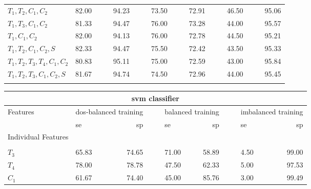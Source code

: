 \begin{table}
{\begin{center}
\begin{tabularx}{0.95\textwidth}{@{}l	lllr	 ll	lllr	 ll lllr @{}}
$T_1,T_2,C_1,C_2$			& \cellcolor[gray]{0.8}82.00	&\cellcolor[gray]{0.8} &\cellcolor[gray]{0.8} & \cellcolor[gray]{0.8}94.23	& & & 73.50 & & & 72.91 & & & 46.50 & & & 95.06\\
$T_1,T_3,C_1,C_2$			& \cellcolor[gray]{0.8}81.33	&\cellcolor[gray]{0.8} &\cellcolor[gray]{0.8} & \cellcolor[gray]{0.8}94.47	& & & 76.00 & & & 73.28 & & & 44.00 & & & 95.57\\
$T_1,C_1,C_2$				& \cellcolor[gray]{0.8}82.00	&\cellcolor[gray]{0.8} &\cellcolor[gray]{0.8} & \cellcolor[gray]{0.8}94.13	& & & 76.00	& & & 72.78 & & & 44.50 & & & 95.21\\
$T_1,T_2,C_1,C_2,S$			& \cellcolor[gray]{0.8}82.33	&\cellcolor[gray]{0.8} &\cellcolor[gray]{0.8} & \cellcolor[gray]{0.8}94.47	& & & 75.50	 & & & 72.42& & & 43.50 & & & 95.33\\
$T_1,T_2,T_3,T_4,C_1,C_2$	& \cellcolor[gray]{0.8}80.83	&\cellcolor[gray]{0.8} &\cellcolor[gray]{0.8} & \cellcolor[gray]{0.8}95.11	& & & 75.00	& & & 72.59 & & & 43.00 & & & 95.84\\
$T_1,T_2,T_3,C_1,C_2,S$		& \cellcolor[gray]{0.8}81.67	&\cellcolor[gray]{0.8} &\cellcolor[gray]{0.8} & \cellcolor[gray]{0.8}94.74	& & & 74.50 & & & 72.96 & & & 44.00 & & & 95.45\\
 	\multicolumn{17}{l}{}\\
  \end{tabularx}  
  \bigskip
	\begin{tabularx}{0.95\textwidth}{@{}l	lllr	 ll	lllr	 ll lllr @{}}
	\toprule
	\multicolumn{17}{c}{ \ac{svm} classifier}\\
	\midrule
	Features & \multicolumn{4}{l}{\ac{dos}-balanced training} & & & \multicolumn{4}{l}{balanced training} & & & \multicolumn{4}{l}{imbalanced training} \\
	\cmidrule{2-5} \cmidrule{8-11} \cmidrule{14-17}
	& \ac{se} & & & \ac{sp} & & &  \ac{se} & & & \ac{sp} & & & \ac{se} & & & \ac{sp} \\
	\cmidrule{2-17}
	Individual Features\\
	\multicolumn{17}{l}{}\\[-2ex]
 $T_3$ & \cellcolor[gray]{0.8}65.83 &\cellcolor[gray]{0.8} &\cellcolor[gray]{0.8} & \cellcolor[gray]{0.8}74.65 & & & 71.00 & & & 58.89 & & & 4.50 & & & 99.00\\
 $T_4$ & \cellcolor[gray]{0.8}78.00 &\cellcolor[gray]{0.8} &\cellcolor[gray]{0.8} & \cellcolor[gray]{0.8}78.78 & & & 47.50 & & & 62.33 & & & 5.00 & & & 97.53 \\
 $C_1$ & \cellcolor[gray]{0.8}61.67 &\cellcolor[gray]{0.8} &\cellcolor[gray]{0.8} & \cellcolor[gray]{0.8}74.40 & & & 45.00 & & & 85.76 & & & 3.00	 & & & 99.49\\

\end{tabularx}
\end{center}}
\end{table}
